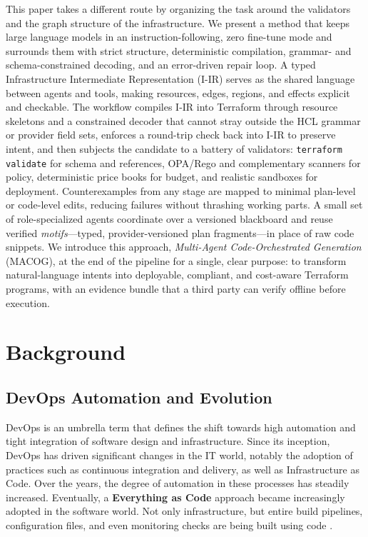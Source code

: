 \documentclass[manuscript,screen,nonacm]{acmart}
\begin{document}
This paper takes a different route by organizing the task around the validators and the graph structure of the infrastructure. We present a method that keeps large language models in an instruction-following, zero fine-tune mode and surrounds them with strict structure, deterministic compilation, grammar- and schema-constrained decoding, and an error-driven repair loop. A typed Infrastructure Intermediate Representation (I-IR) serves as the shared language between agents and tools, making resources, edges, regions, and effects explicit and checkable. The workflow compiles I-IR into Terraform through resource skeletons and a constrained decoder that cannot stray outside the HCL grammar \cite{riti2021beginning} or provider field sets, enforces a round-trip check back into I-IR to preserve intent, and then subjects the candidate to a battery of validators: \texttt{terraform validate} for schema and references, OPA/Rego and complementary scanners for policy, deterministic price books for budget, and realistic sandboxes for deployment. Counterexamples from any stage are mapped to minimal plan-level or code-level edits, reducing failures without thrashing working parts. A small set of role-specialized agents coordinate over a versioned blackboard and reuse verified \emph{motifs}—typed, provider-versioned plan fragments—in place of raw code snippets. We introduce this approach, \emph{Multi-Agent Code-Orchestrated Generation} (MACOG), at the end of the pipeline for a single, clear purpose: to transform natural-language intents into deployable, compliant, and cost-aware Terraform programs, with an evidence bundle that a third party can verify offline before execution.

\section{Background}

\subsection{DevOps Automation and Evolution}
DevOps is an umbrella term that defines the shift towards high automation and tight integration of software design and infrastructure. Since its inception, DevOps has driven significant changes in the IT world, notably the adoption of practices such as continuous integration and delivery, as well as Infrastructure as Code. Over the years, the degree of automation in these processes has steadily increased. Eventually, a \textbf{Everything as Code} approach became increasingly adopted in the software world. Not only infrastructure, but entire build pipelines, configuration files, and even monitoring checks are being built using code \cite{vakhula2025research}. 
\end{document}

